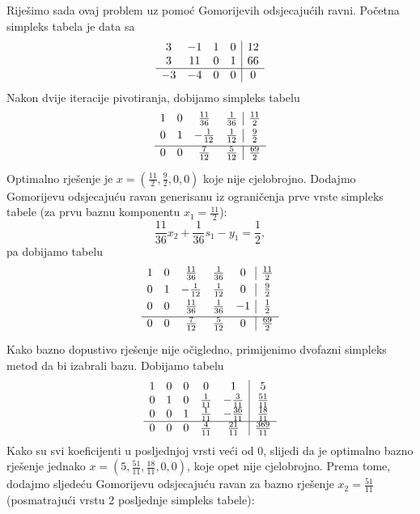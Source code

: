\documentclass[a4paper, utf8, 11pt, colorlinks]{book}
\theoremstyle{definition}
\begin{document}
Riješimo sada ovaj problem uz pomoć Gomorijevih odsjecajućih ravni. 
Početna simpleks tabela je data sa 
$$\begin{array}{ccc c| c}
    3  & -1 & 1 &  0  & 12  \\
    3  & 11 & 0 &  1  & 66 \\ \hline
   -3  & -4 & 0 &  0  & 0
\end{array}$$
Nakon dvije iteracije pivotiranja, dobijamo simpleks tabelu 
$$\begin{array}{ccc c| c}\vspace{1mm}
1 & 0 &  \frac{11}{36}   &  \frac{1}{36}  &  \frac{11}{2} \\\vspace{1mm}
0 & 1 &  -\frac{1}{12}  &  \frac{1}{12}  &  \frac{9}{2}   \\ \hline\vspace{1mm}
0 & 0 &  \frac{7}{12}   &  \frac{5}{12}  &  \frac{69}{2}
\end{array} $$
Optimalno rješenje je $x = (\frac{11}{2}, \frac{9}{2}, 0, 0)$ koje nije cjelobrojno. Dodajmo Gomorijevu odsjecajuću ravan generisanu iz ograničenja prve vrste simpleks tabele (za prvu baznu komponentu $x_1 = \frac{11}{2}$):
$$  \frac{11}{36} x_2 + \frac{1}{36} s_1 - y_1 = \frac{1}{2},$$
pa dobijamo tabelu 
$$\begin{array}{ccccc| c}\vspace{1mm}
1 &  0 &   \frac{11}{36}  & \frac{1}{36}   &  0 & \frac{11}{2} \\\vspace{1mm}
0 &  1 &   -\frac{1}{12}  & \frac{1}{12}   &  0 & \frac{9}{2} \\\vspace{1mm}
0 &  0 &  \frac{11}{36}   &  \frac{1}{36}  & -1 & \frac{1}{2} \\ \hline\vspace{1mm}
0 & 0  &  \frac{7}{12}    & \frac{5}{12}   &  0 & \frac{69}{2}
\end{array} $$
Kako bazno dopustivo rješenje nije očigledno, primijenimo dvofazni simpleks metod da bi izabrali bazu. Dobijamo tabelu
$$\begin{array}{ccccc| c}
1   &   0       &   0   &   0             & 1              & 5 \\
0   &   1       &   0   &   \frac{1}{11}  & -\frac{3}{11}  & \frac{51}{11} \\
0   &   0       &   1   &   \frac{1}{11}  & -\frac{36}{11} &  \frac{18}{11} \\ \hline
0   &   0       &   0   &   \frac{4}{11}  & \frac{21}{11}  &  \frac{369}{11} \\
\end{array} $$
Kako su svi koeficijenti u posljednjoj vrsti veći od 0, slijedi da je optimalno bazno rješenje jednako $x=(5, \frac{51}{11}, \frac{18}{11}, 0, 0)$, koje opet nije cjelobrojno. 
 Prema tome, dodajmo sljedeću Gomorijevu odsjecajuću ravan za bazno rješenje $x_2 = \frac{51}{11}$ (posmatrajući vrstu 2 posljednje simpleks tabele):
 
\end{document}
